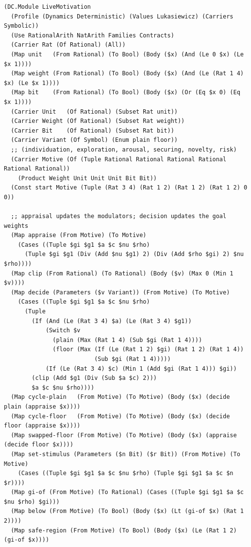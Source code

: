 \documentclass[11pt]{article}
\theoremstyle{definition}
\theoremstyle{plain}
\begin{document}
\begin{lstlisting}[style=mettamod]
(DC.Module LiveMotivation
  (Profile (Dynamics Deterministic) (Values Lukasiewicz) (Carriers Symbolic))
  (Use RationalArith NatArith Families Contracts)
  (Carrier Rat (Of Rational) (All))
  (Map unit   (From Rational) (To Bool) (Body ($x) (And (Le 0 $x) (Le $x 1))))
  (Map weight (From Rational) (To Bool) (Body ($x) (And (Le (Rat 1 4) $x) (Le $x 1))))
  (Map bit    (From Rational) (To Bool) (Body ($x) (Or (Eq $x 0) (Eq $x 1))))
  (Carrier Unit   (Of Rational) (Subset Rat unit))
  (Carrier Weight (Of Rational) (Subset Rat weight))
  (Carrier Bit    (Of Rational) (Subset Rat bit))
  (Carrier Variant (Of Symbol) (Enum plain floor))
  ;; (individuation, exploration, arousal, securing, novelty, risk)
  (Carrier Motive (Of (Tuple Rational Rational Rational Rational Rational Rational))
    (Product Weight Unit Unit Unit Bit Bit))
  (Const start Motive (Tuple (Rat 3 4) (Rat 1 2) (Rat 1 2) (Rat 1 2) 0 0))

  ;; appraisal updates the modulators; decision updates the goal weights
  (Map appraise (From Motive) (To Motive)
    (Cases ((Tuple $gi $g1 $a $c $nu $rho)
      (Tuple $gi $g1 (Div (Add $nu $g1) 2) (Div (Add $rho $gi) 2) $nu $rho))))
  (Map clip (From Rational) (To Rational) (Body ($v) (Max 0 (Min 1 $v))))
  (Map decide (Parameters ($v Variant)) (From Motive) (To Motive)
    (Cases ((Tuple $gi $g1 $a $c $nu $rho)
      (Tuple
        (If (And (Le (Rat 3 4) $a) (Le (Rat 3 4) $g1))
            (Switch $v
              (plain (Max (Rat 1 4) (Sub $gi (Rat 1 4))))
              (floor (Max (If (Le (Rat 1 2) $gi) (Rat 1 2) (Rat 1 4))
                          (Sub $gi (Rat 1 4)))))
            (If (Le (Rat 3 4) $c) (Min 1 (Add $gi (Rat 1 4))) $gi))
        (clip (Add $g1 (Div (Sub $a $c) 2)))
        $a $c $nu $rho))))
  (Map cycle-plain   (From Motive) (To Motive) (Body ($x) (decide plain (appraise $x))))
  (Map cycle-floor   (From Motive) (To Motive) (Body ($x) (decide floor (appraise $x))))
  (Map swapped-floor (From Motive) (To Motive) (Body ($x) (appraise (decide floor $x))))
  (Map set-stimulus (Parameters ($n Bit) ($r Bit)) (From Motive) (To Motive)
    (Cases ((Tuple $gi $g1 $a $c $nu $rho) (Tuple $gi $g1 $a $c $n $r))))
  (Map gi-of (From Motive) (To Rational) (Cases ((Tuple $gi $g1 $a $c $nu $rho) $gi)))
  (Map below (From Motive) (To Bool) (Body ($x) (Lt (gi-of $x) (Rat 1 2))))
  (Map safe-region (From Motive) (To Bool) (Body ($x) (Le (Rat 1 2) (gi-of $x))))


\end{lstlisting}
\end{document}
